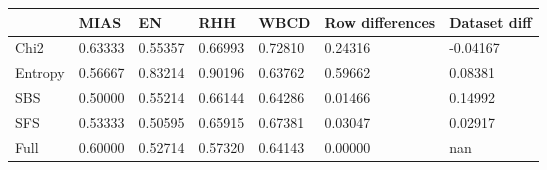 \begin{tabular}{|l|l|l|l|l|l|l|}
\toprule
{} &    MIAS &      EN &     RHH &    WBCD & Row differences & Dataset diff \\
\midrule
Chi2    & 0.63333 & 0.55357 & 0.66993 & 0.72810 &         0.24316 &     -0.04167 \\
Entropy & 0.56667 & 0.83214 & 0.90196 & 0.63762 &         0.59662 &      0.08381 \\
SBS     & 0.50000 & 0.55214 & 0.66144 & 0.64286 &         0.01466 &      0.14992 \\
SFS     & 0.53333 & 0.50595 & 0.65915 & 0.67381 &         0.03047 &      0.02917 \\
Full    & 0.60000 & 0.52714 & 0.57320 & 0.64143 &         0.00000 &          nan \\
\bottomrule
\end{tabular}
